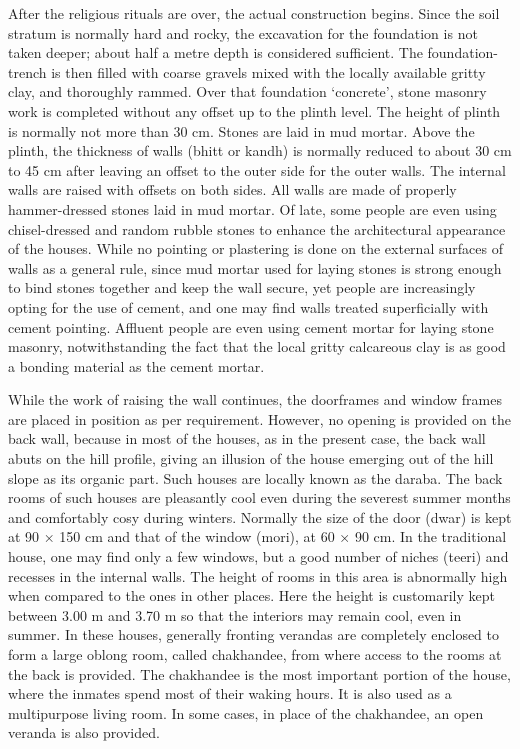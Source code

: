 After the religious rituals are over, the actual construction begins. Since the soil stratum is normally hard and rocky, the excavation for the foundation is not taken deeper; about half a metre depth is considered sufficient. The foundation-trench is then filled with coarse gravels mixed with the locally available gritty clay, and thoroughly rammed. Over that foundation ‘concrete’, stone masonry work is completed without any offset up to the plinth level. The height of plinth is normally not more than 30 cm. Stones are laid in mud mortar. Above the plinth, the thickness of walls (bhitt or kandh) is normally reduced to about 30 cm to 45 cm after leaving an offset to the outer side for the outer walls. The internal walls are raised with offsets on both sides. All walls are made of properly hammer-dressed stones laid in mud mortar. Of late, some people are even using chisel-dressed and random rubble stones to enhance the architectural appearance of the houses. While no pointing or plastering is done on the external surfaces of walls as a general rule, since mud mortar used for laying stones is strong enough to bind stones together and keep the wall secure, yet people are increasingly opting for the use of cement, and one may find walls treated superficially with cement pointing. Affluent people are even using cement mortar for laying stone masonry, notwithstanding the fact that the local gritty calcareous clay is as good a bonding material as the cement mortar.

While the work of raising the wall continues, the doorframes and window frames are placed in position as per requirement. However, no opening is provided on the back wall, because in most of the houses, as in the present case, the back wall abuts on the hill profile, giving an illusion of the house emerging out of the hill slope as its organic part. Such houses are locally known as the daraba. The back rooms of such houses are pleasantly cool even during the severest summer months and comfortably cosy during winters. Normally the size of the door (dwar) is kept at 90 × 150 cm and that of the window (mori), at 60 × 90 cm. In the traditional house, one may find only a few windows, but a good number of niches (teeri) and recesses in the internal walls. The height of rooms in this area is abnormally high when compared to the ones in other places. Here the height is customarily kept between 3.00 m and 3.70 m so that the interiors may remain cool, even in summer. In these houses, generally fronting verandas are completely enclosed to form a large oblong room, called chakhandee, from where access to the rooms at the back is provided. The chakhandee is the most important portion of the house, where the inmates spend most of their waking hours. It is also used as a multipurpose living room. In some cases, in place of the chakhandee, an open veranda is also provided.

